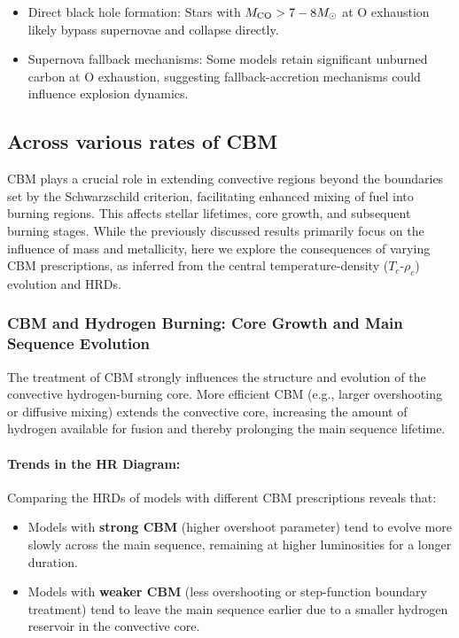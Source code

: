 \begin{itemize}
    \item Direct black hole formation: Stars with $M_{\rm CO} > 7-8 M_\odot$ at O exhaustion likely bypass supernovae and collapse directly.
    \item Supernova fallback mechanisms: Some models retain significant unburned carbon at O exhaustion, suggesting fallback-accretion mechanisms could influence explosion dynamics.
\end{itemize}

\subsection{Across various rates of CBM}

CBM plays a crucial role in extending convective regions beyond the boundaries set by the Schwarzschild criterion, facilitating enhanced mixing of fuel into burning regions. This affects stellar lifetimes, core growth, and subsequent burning stages. While the previously discussed results primarily focus on the influence of mass and metallicity, here we explore the consequences of varying CBM prescriptions, as inferred from the central temperature-density ($T_c$-$\rho_c$) evolution and HRDs.

\subsubsection{CBM and Hydrogen Burning: Core Growth and Main Sequence Evolution}

The treatment of CBM strongly influences the structure and evolution of the convective hydrogen-burning core. More efficient CBM (e.g., larger overshooting or diffusive mixing) extends the convective core, increasing the amount of hydrogen available for fusion and thereby prolonging the main sequence lifetime.

\paragraph{Trends in the HR Diagram:} 
Comparing the HRDs of models with different CBM prescriptions reveals that:
\begin{itemize}
    \item Models with \textbf{strong CBM} (higher overshoot parameter) tend to evolve more slowly across the main sequence, remaining at higher luminosities for a longer duration.
    \item Models with \textbf{weaker CBM} (less overshooting or step-function boundary treatment) tend to leave the main sequence earlier due to a smaller hydrogen reservoir in the convective core.
\end{itemize}

